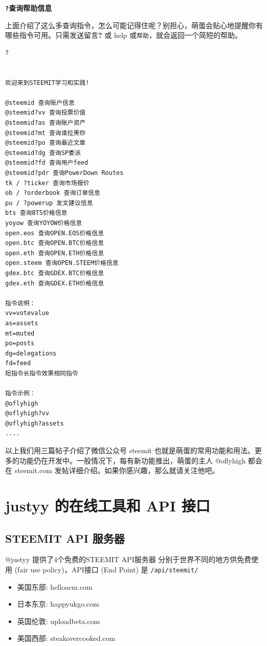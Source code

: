 \documentclass[]{ctexbook}
\providecommand{\tightlist}{%
  \setlength{\itemsep}{0pt}\setlength{\parskip}{0pt}}
\begin{document}
\textbf{\texttt{?}查询帮助信息}

上面介绍了这么多查询指令，怎么可能记得住呢？别担心，萌蛋会贴心地提醒你有哪些指令可用。只需发送留言\textbf{?} 或 help 或\texttt{帮助}，就会返回一个简短的帮助。

\begin{verbatim}
?


欢迎来到STEEMIT学习和实践!

@steemid 查询账户信息
@steemid?vv 查询投票价值
@steemid?as 查询账户资产
@steemid?mt 查询谁拉黑你
@steemid?po 查询最近文章
@steemid?dg 查询SP委派
@steemid?fd 查询用户feed
@steemid?pdr 查询PowerDown Routes
tk / ?ticker 查询市场报价
ob / ?orderbook 查询订单信息
pu / ?powerup 发文建议信息
bts 查询BTS价格信息
yoyow 查询YOYOW价格信息
open.eos 查询OPEN.EOS价格信息
open.btc 查询OPEN.BTC价格信息
open.eth 查询OPEN.ETH价格信息
open.steem 查询OPEN.STEEM价格信息
gdex.btc 查询GDEX.BTC价格信息
gdex.eth 查询GDEX.ETH价格信息

指令说明：
vv=votevalue
as=assets
mt=muted
po=posts
dg=delegations
fd=feed
短指令长指令效果相同指令

指令示例：
@oflyhigh
@oflyhigh?vv
@oflyhigh?assets
....
\end{verbatim}

以上我们用三篇帖子介绍了微信公众号 steemit 也就是萌蛋的常用功能和用法。更多的功能仍在开发中。一般情况下，每有新功能推出，萌蛋的主人 @oflyhigh 都会在 steemit.com 发帖详细介绍。如果你感兴趣，那么就请关注他吧。

\hypertarget{justyy_dzxgjh_api_ckdsyff}{%
\section{justyy 的在线工具和 API 接口}\label{justyy_dzxgjh_api_ckdsyff}}

\hypertarget{steemit-api-}{%
\subsection{STEEMIT API 服务器}\label{steemit-api-}}

@justyy 提供了4个免费的STEEMIT API服务器 分别于世界不同的地方供免费使用 (fair use policy)，API接口 (End Point) 是 \texttt{/api/steemit/}

\begin{itemize}
\tightlist
\item
  美国东部: helloacm.com
\item
  日本东京: happyukgo.com
\item
  英国伦敦: uploadbeta.com
\item
  美国西部: steakovercooked.com
\end{itemize}
\end{document}
